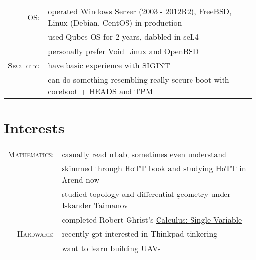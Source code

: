 \documentclass[a4paper,11pt]{article}
\begin{document}
\begin{longtable}{rp{}}
      \textsc{OS:} & operated Windows Server (2003 - 2012R2), FreeBSD, Linux (Debian, CentOS) in production \\
                   & used Qubes OS for 2 years, dabbled in seL4                                             \\
                   & personally prefer Void Linux and OpenBSD                                               \\

      \textsc{Security:} & have basic experience with SIGINT                                            \\
                         & can do something resembling really secure boot with coreboot + HEADS and TPM \\
    \end{longtable}

  \section{Interests}
    \begin{tabular}{rl}
      \textsc{Mathematics:} & casually read nLab, sometimes even understand                      \\
                            & skimmed through HoTT book and studying HoTT in Arend now           \\
                            & studied topology and differential geometry under Iskander Taimanov \\
                            & completed Robert Ghrist's
                              \href{https://www.coursera.org/account/accomplishments/records/9Y3N9X2BMR}{Calculus:
                              Single Variable} \\
      \textsc{Hardware:} & recently got interested in Thinkpad tinkering \\
                         & want to learn building UAVs                   \\
    \end{tabular}
\end{document}
